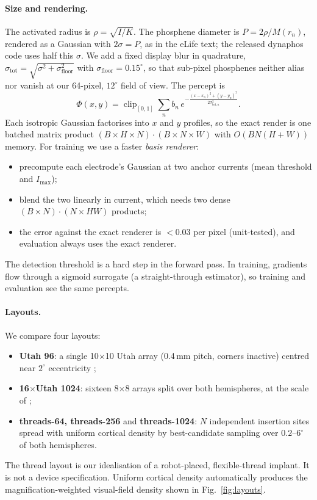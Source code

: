 \paragraph{Size and rendering.} The activated radius is $\rho=\sqrt{I/K}$. The phosphene diameter is $P=2\rho/M(r_n)$, rendered as a Gaussian with $2\sigma=P$, as in the eLife text; the released dynaphos code uses half this $\sigma$. We add a fixed display blur in quadrature, $\sigma_{\mathrm{tot}}=\sqrt{\sigma^2+\sigma_{\mathrm{floor}}^2}$ with $\sigma_{\mathrm{floor}}=0.15^\circ$, so that sub-pixel phosphenes neither alias nor vanish at our 64-pixel, $12^\circ$ field of view. The percept is
\begin{equation}
\Phi(x,y)=\operatorname{clip}_{[0,1]}\sum_n b_n\,e^{-\frac{(x-x_n)^2+(y-y_n)^2}{2\sigma_{\mathrm{tot},n}^2}}.
\label{eq:render}
\end{equation}
Each isotropic Gaussian factorises into $x$ and $y$ profiles, so the exact render is one batched matrix product $(B{\times}H{\times}N)\cdot(B{\times}N{\times}W)$ with $O(BN(H{+}W))$ memory. For training we use a faster \emph{basis renderer}:
\begin{itemize}
\item precompute each electrode's Gaussian at two anchor currents (mean threshold and $I_{\max}$);
\item blend the two linearly in current, which needs two dense $(B{\times}N)\cdot(N{\times}HW)$ products;
\item the error against the exact renderer is $<0.03$ per pixel (unit-tested), and evaluation always uses the exact renderer.
\end{itemize}
The detection threshold is a hard step in the forward pass. In training, gradients flow through a sigmoid surrogate (a straight-through estimator), so training and evaluation see the same percepts.

\paragraph{Layouts.} We compare four layouts:
\begin{itemize}
\item \textbf{Utah 96}: a single 10$\times$10 Utah array (0.4\,mm pitch, corners inactive) centred near $2^\circ$ eccentricity \citep{maynard1997utah,fernandez2021visual};
\item \textbf{16$\times$Utah 1024}: sixteen 8$\times$8 arrays split over both hemispheres, at the scale of \citet{chen2020shape};
\item \textbf{threads-64, threads-256} and \textbf{threads-1024}: $N$ independent insertion sites spread with uniform cortical density by best-candidate sampling \citep{mitchell1991spectrally} over $0.2$--$6^\circ$ of both hemispheres.
\end{itemize}
The thread layout is our idealisation of a robot-placed, flexible-thread implant. It is not a device specification. Uniform cortical density automatically produces the magnification-weighted visual-field density shown in Fig.~\ref{fig:layouts}.

